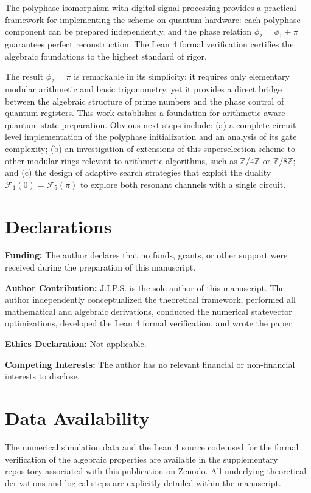 \documentclass[12pt,a4paper]{article}
\theoremstyle{plain}
\theoremstyle{definition}
\theoremstyle{remark}
\begin{document}
The polyphase isomorphism with digital signal processing provides a practical framework for implementing the scheme on quantum hardware: each polyphase component can be prepared independently, and the phase relation \(\phi_2 = \phi_1 + \pi\) guarantees perfect reconstruction. The Lean 4 formal verification certifies the algebraic foundations to the highest standard of rigor.

The result \(\phi_2 = \pi\) is remarkable in its simplicity: it requires only elementary modular arithmetic and basic trigonometry, yet it provides a direct bridge between the algebraic structure of prime numbers and the phase control of quantum registers. This work establishes a foundation for arithmetic-aware quantum state preparation. Obvious next steps include: (a) a complete circuit-level implementation of the polyphase initialization and an analysis of its gate complexity; (b) an investigation of extensions of this superselection scheme to other modular rings relevant to arithmetic algorithms, such as \(\mathbb{Z}/4\mathbb{Z}\) or \(\mathbb{Z}/8\mathbb{Z}\); and (c) the design of adaptive search strategies that exploit the duality \(\mathcal{F}_1(0) = \mathcal{F}_5(\pi)\) to explore both resonant channels with a single circuit.

\section*{Declarations}

\textbf{Funding:} The author declares that no funds, grants, or other support were received during the preparation of this manuscript.

\vspace{0.5em}
\noindent\textbf{Author Contribution:} J.I.P.S. is the sole author of this manuscript. The author independently conceptualized the theoretical framework, performed all mathematical and algebraic derivations, conducted the numerical statevector optimizations, developed the Lean 4 formal verification, and wrote the paper.

\vspace{0.5em}
\noindent\textbf{Ethics Declaration:} Not applicable.

\vspace{0.5em}
\noindent\textbf{Competing Interests:} The author has no relevant financial or non-financial interests to disclose.

\section*{Data Availability}
The numerical simulation data and the Lean 4 source code used for the formal verification of the algebraic properties are available in the supplementary repository associated with this publication on Zenodo. All underlying theoretical derivations and logical steps are explicitly detailed within the manuscript.
\end{document}
